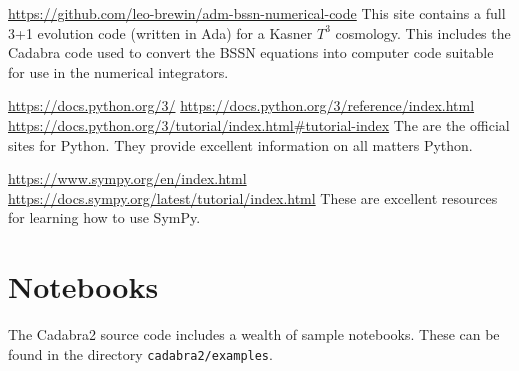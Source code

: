 \documentclass[a4paper,12pt]{article}
\numberwithin{equation}{section}%
\begin{document}
\url{https://github.com/leo-brewin/adm-bssn-numerical-code}\Break
This site contains a full 3+1 evolution code (written in Ada) for a Kasner $T^3$ cosmology.
This includes the Cadabra code used to convert the BSSN equations into computer code suitable
for use in the numerical integrators.

\url{https://docs.python.org/3/}\Break
\url{https://docs.python.org/3/reference/index.html}\Break
\url{https://docs.python.org/3/tutorial/index.html#tutorial-index}\Break
The are the official sites for Python. They provide excellent information on all matters
Python.

\url{https://www.sympy.org/en/index.html}\Break
\url{https://docs.sympy.org/latest/tutorial/index.html}\Break
These are excellent resources for learning how to use SymPy.

\section*{Notebooks}

The Cadabra2 source code includes a wealth of sample notebooks. These can be found in
the directory \verb|cadabra2/examples|.



\end{document}
